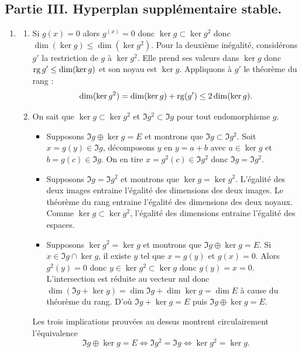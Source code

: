 \subsection*{Partie III. Hyperplan supplémentaire stable.}
\begin{enumerate}
 \item 
\begin{enumerate}
 \item Si $g(x)=0$ alors $g^(x)=0$ donc $\ker g \subset \ker g^2$ donc $\dim(\ker g) \leq \dim(\ker g^2)$.\newline
Pour la deuxième inégalité, considérons $g'$ la restriction de $g$ à $\ker g^2$. Elle prend ses valeurs dans $\ker g$ donc $\operatorname{rg} g' \leq \dim(\ker g)$ et son noyau est $\ker g$. Appliquons à $g'$ le théorème du rang :
\[
 \dim(\ker g^2) = \dim(\ker g) + \operatorname{rg}(g')\leq 2\dim(\ker g).
\]

 \item \label{equiv} On sait que $\ker g \subset \ker g^2$ et $\Im g^2 \subset \Im g$ pour tout endomorphisme $g$.\medskip
\begin{itemize}
  \item Supposons $\Im g \oplus \ker g = E$ et montrons que $\Im g \subset \Im g^2$.\newline
Soit $x=g(y)\in \Im g$, décomposons $y$ en $y=a+b$ avec $a\in \ker g$ et $b=g(c)\in \Im g$. On en tire $x=g^2(c)\in \Im g^2$ donc $\Im g = \Im g^2$.\smallskip

  \item Supposons $\Im g = \Im g^2$ et montrons que $\ker g = \ker g^2$.\newline
  L'égalité des deux images entraine l'égalité des dimensions des deux images. Le théorème du rang entraine l'égalité des dimensions des deux noyaux. Comme $\ker g \subset \ker g^2$, l'égalité des dimensions entraine l'égalité des espaces.\smallskip
  
  \item Supposons $\ker g^2 = \ker g$ et montrons que $\Im g \oplus \ker g = E$. \newline
Si $x \in \Im g \cap \ker g$, il existe $y$ tel que $x=g(y)$ et $g(x)=0$. Alors $g^2(y)=0$ donc $y\in \ker g^2 \subset \ker g$ donc $g(y)=x=0$. L'intersection est réduite au vecteur nul donc $\dim (\Im g + \ker g) = \dim \Im g + \dim \ker g = \dim E$ à cause du théorème du rang. D'où $\Im g + \ker g = E$ puis $\Im g \oplus \ker g = E$.
\end{itemize}\smallskip
Les trois implications prouvées au dessus montrent circulairement l'équivalence
\[
  \Im g \oplus \ker g = E \Leftrightarrow \Im g^2 = \Im g \Leftrightarrow \ker g^2 = \ker g .
\]
\end{enumerate}


\end{enumerate}

